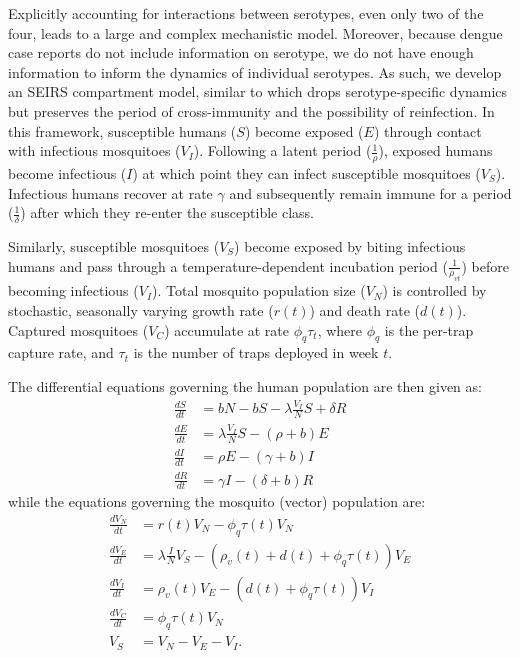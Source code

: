 \documentclass[10pt,letterpaper]{article}
\begin{document}
Explicitly accounting for interactions between serotypes, even only two of the four, leads to a large and complex mechanistic model.
Moreover, because dengue case reports do not include information on serotype, we do not have enough information to inform the dynamics of individual serotypes.
As such, we develop an SEIRS compartment model, similar to \cite{Newton1992, Burattini2008, Pinho2010} which drops serotype-specific dynamics but preserves the period of cross-immunity and the possibility of reinfection.
In this framework, susceptible humans ($S$) become exposed ($E$) through contact with infectious mosquitoes ($V_I$).
Following a latent period ($\frac{1}{\rho}$), exposed humans become infectious ($I$) at which point they can infect susceptible mosquitoes ($V_S$).
Infectious humans recover at rate $\gamma$ and subsequently remain immune for a period ($\frac{1}{\delta}$) after which they re-enter the susceptible class.

Similarly, susceptible mosquitoes ($V_S$) become exposed by biting infectious humans and pass through a temperature-dependent incubation period ($\frac{1}{\rho_{vt}}$) before becoming infectious ($V_I$).
Total mosquito population size ($V_N$) is controlled by stochastic, seasonally varying growth rate ($r(t)$) and death rate ($d(t)$).
Captured mosquitoes ($V_C$) accumulate at rate $\phi_q \tau_t$, where $\phi_q$ is the per-trap capture rate, and $\tau_t$ is the number of traps deployed in week $t$.

The differential equations governing the human population are then given as:
\begin{align} 
\frac{dS}{dt} &= bN - bS - \lambda \frac{V_{I}}{N} S + \delta R\\
\frac{dE}{dt} &= \lambda \frac{V_{I}}{N} S - (\rho + b)E\\
\frac{dI}{dt} &= \rho E - (\gamma + b)I\\
\frac{dR}{dt} &= \gamma I - (\delta + b)R
\end{align}
while the equations governing the mosquito (vector) population are:
\begin{align}
\frac{dV_N}{dt} & = r(t) V_N - \phi_q \tau(t) V_N \\
\frac{dV_E}{dt} &= \lambda \frac{I}{N} V_S - (\rho_{v}(t) + d(t) + \phi_q \tau(t))V_E\\
\frac{dV_I}{dt} &= \rho_{v}(t) V_E - (d(t) + \phi_q \tau(t)) V_I\\
\frac{dV_C}{dt} & = \phi_q \tau(t) V_N\\
V_S &= V_N - V_E - V_I.
\end{align}
\end{document}
